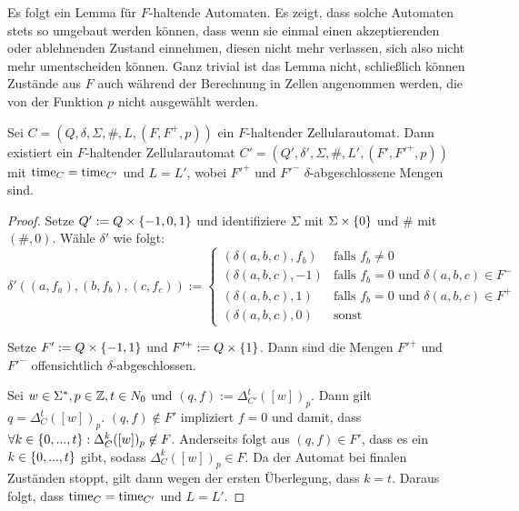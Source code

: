 Es folgt ein Lemma für $F$-haltende Automaten. Es zeigt, dass solche Automaten stets so umgebaut werden können,
dass wenn sie einmal einen akzeptierenden oder ablehnenden Zustand einnehmen, diesen nicht mehr verlassen, sich also nicht mehr umentscheiden können.
Ganz trivial ist das Lemma nicht, schließlich können Zustände aus $F$ auch während der Berechnung in Zellen angenommen werden,
die von der Funktion $p$ nicht ausgewählt werden.

\begin{lemma}
    \label{lemmaAbgeschlosseneMenge}
    
    Sei $C = (Q, \delta, \Sigma, \#, L, (F, F^+, p))$ ein $F$-haltender Zellularautomat.
    Dann existiert ein $F$-haltender Zellularautomat $C' = (Q', \delta', \Sigma, \#, L', (F', F'^+, p))$ mit $\operatorname{time}_{C} = \operatorname{time}_{C'}$ und $L = L'$,
    wobei $F'^+$ und $F'^-$ $\delta$-abgeschlossene Mengen sind.
\end{lemma}
\begin{proof}
    Setze $Q' := Q \times \{ {{-1}, 0, 1} \}$ und identifiziere $\Sigma$ mit $\Sigma \times \{ {0} \}$ und $\#$ mit $(\#, 0)$.
    Wähle $\delta'$ wie folgt:
    \[
       \delta'((a, f_a), (b, f_b), (c, f_c)) :=
       \begin{cases}
         (\delta(a, b, c), f_b)  & \text{falls } f_b \neq 0 \\
         (\delta(a, b, c), {-1}) & \text{falls } f_b = 0 \text{ und } \delta(a, b, c) \in F^- \\
         (\delta(a, b, c), {1}) & \text{falls } f_b = 0 \text{ und }  \delta(a, b, c) \in F^+ \\
         (\delta(a, b, c), {0}) & \text{sonst}
       \end{cases}
    \]
    
    Setze $F' := Q \times \{ {{-1}, 1} \}$ und $F'^+ := Q \times \{ {1} \}$.
    Dann sind die Mengen $F'^+$ und $F'^-$ offensichtlich $\delta$-abgeschlossen.
    
    Sei $w \in \Sigma^*, p \in \mathbb{Z}, t \in N_0$ und $(q, f) := \Delta_{C'}^t([w])_p$.
    Dann gilt $q = \Delta_{C}^t([w])_p$. $(q, f) \not\in F'$ impliziert $f = 0$ und damit, dass $\forall k \in \{ { 0, ..., t } \}: \Delta_{C}^k([w])_p \not\in F$.
    Anderseits folgt aus $(q, f) \in F'$, dass es ein $k \in \{ {0, ...,  t} \}$ gibt, sodass $\Delta_{C}^k([w])_p \in F$.
    Da der Automat bei finalen Zuständen stoppt, gilt dann wegen der ersten Überlegung, dass $k = t$.
    Daraus folgt, dass $\operatorname{time}_{C} = \operatorname{time}_{C'}$ und $L = L'$.
\end{proof}


